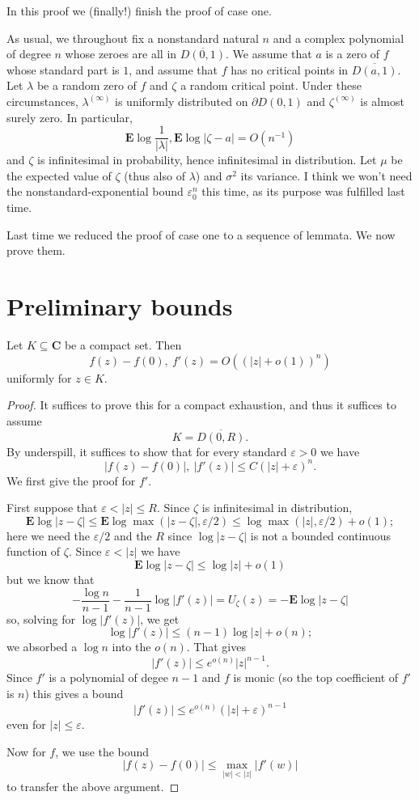 \documentclass[12pt]{article}
\begin{document}

In this proof we (finally!) finish the proof of case one.

As usual, we throughout fix a nonstandard natural $n$ and a complex polynomial of degree $n$ whose zeroes are all in $\overline{D(0, 1)}$.
We assume that $a$ is a zero of $f$ whose standard part is $1$, and assume that $f$ has no critical points in $\overline{D(a, 1)}$.
Let $\lambda$ be a random zero of $f$ and $\zeta$ a random critical point.
Under these circumstances, $\lambda^{(\infty)}$ is uniformly distributed on $\partial D(0, 1)$ and $\zeta^{(\infty)}$ is almost surely zero. In particular,
$$\mathbf E \log\frac{1}{|\lambda|}, \mathbf E \log |\zeta - a| = O(n^{-1})$$
and $\zeta$ is infinitesimal in probability, hence infinitesimal in distribution.
Let $\mu$ be the expected value of $\zeta$ (thus also of $\lambda$) and $\sigma^2$ its variance.
I think we won't need the nonstandard-exponential bound $\varepsilon_0^n$ this time, as its purpose was fulfilled last time.

Last time we reduced the proof of case one to a sequence of lemmata. We now prove them.

\section{Preliminary bounds}
\begin{lemma}
Let $K \subseteq \mathbf C$ be a compact set. Then
$$f(z) - f(0), ~f'(z) = O((|z| + o(1))^n)$$
uniformly for $z \in K$.
\end{lemma}
\begin{proof}
It suffices to prove this for a compact exhaustion, and thus it suffices to assume
$$K = \overline{D(0, R)}.$$
By underspill, it suffices to show that for every standard $\varepsilon > 0$ we have
$$|f(z) - f(0)|, ~|f'(z)| \leq C(|z| + \varepsilon)^n.$$
We first give the proof for $f'$.

First suppose that $\varepsilon < |z| \leq R$.
Since $\zeta$ is infinitesimal in distribution,
$$\mathbf E \log |z - \zeta| \leq \mathbf E \log \max(|z - \zeta|, \varepsilon/2) \leq \log \max(|z|, \varepsilon/2) + o(1);$$
here we need the $\varepsilon/2$ and the $R$ since $\log |z - \zeta|$ is not a bounded continuous function of $\zeta$.
Since $\varepsilon < |z|$ we have
$$\mathbf E \log |z - \zeta| \leq \log |z| + o(1)$$
but we know that
$$-\frac{\log n}{n - 1} - \frac{1}{n - 1} \log |f'(z)| = U_\zeta(z) = -\mathbf E \log |z - \zeta|$$
so, solving for $\log |f'(z)|$, we get
$$\log |f'(z)| \leq (n - 1) \log |z| + o(n);$$
we absorbed a $\log n$ into the $o(n)$. That gives
$$|f'(z)| \leq e^{o(n)} |z|^{n-1}.$$
Since $f'$ is a polynomial of degee $n - 1$ and $f$ is monic (so the top coefficient of $f'$ is $n$) this gives a bound
$$|f'(z)| \leq e^{o(n)} (|z| + \varepsilon)^{n - 1}$$
even for $|z| \leq \varepsilon$.

Now for $f$, we use the bound
$$|f(z) - f(0)| \leq \max_{|w| < |z|} |f'(w)|$$
to transfer the above argument.
\end{proof}
\end{document}
